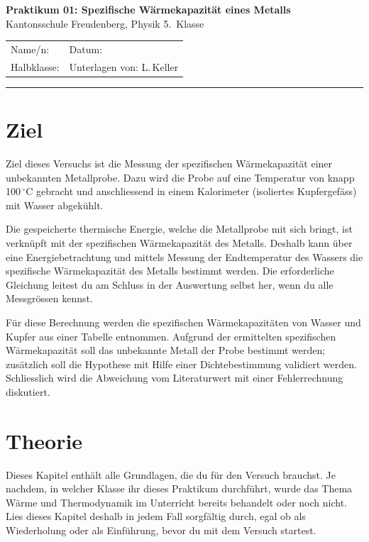 \documentclass[11pt,a4paper]{article}
\newcommand{\celsius}{\ensuremath{^{\circ}\mathrm{C}}}
\newcommand{\SI}[2]{#1\,#2}
\begin{document}
\thispagestyle{empty}

\begin{center}
  {\color{kfrblue}\Large\bfseries Praktikum 01: Spezifische W\"armekapazit\"at eines Metalls}\\[2pt]
  {\normalsize Kantonsschule Freudenberg, Physik 5.\ Klasse}
\end{center}

\vspace{4pt}
\noindent
\begin{tabularx}{\linewidth}{@{}X X@{}}
  Name/n: \dotfill & Datum: \dotfill \\[4pt]
  Halbklasse: \dotfill & Unterlagen von: L.\,Keller \\
\end{tabularx}

\vspace{10pt}
\hrule
\vspace{10pt}

\section{Ziel}
Ziel dieses Versuchs ist die Messung der spezifischen W\"armekapazit\"at einer unbekannten Metallprobe. Dazu wird die Probe auf eine Temperatur von knapp \SI{100}{\celsius} gebracht und anschliessend in einem Kalorimeter (isoliertes Kupfergef\"ass) mit Wasser abgek\"uhlt.

Die gespeicherte thermische Energie, welche die Metallprobe mit sich bringt, ist verkn\"upft mit der spezifischen W\"armekapazit\"at des Metalls. Deshalb kann \"uber eine Energiebetrachtung und mittels Messung der Endtemperatur des Wassers die spezifische W\"armekapazit\"at des Metalls bestimmt werden. Die erforderliche Gleichung leitest du am Schluss in der Auswertung selbst her, wenn du alle Messgr\"ossen kennst.

F\"ur diese Berechnung werden die spezifischen W\"armekapazit\"aten von Wasser und Kupfer aus einer Tabelle entnommen. Aufgrund der ermittelten spezifischen W\"armekapazit\"at soll das unbekannte Metall der Probe bestimmt werden; zus\"atzlich soll die Hypothese mit Hilfe einer Dichtebestimmung validiert werden. Schliesslich wird die Abweichung vom Literaturwert mit einer Fehlerrechnung diskutiert.

\section{Theorie}
\label{sec:theorie}
Dieses Kapitel enth\"alt alle Grundlagen, die du f\"ur den Versuch brauchst. Je nachdem, in welcher Klasse ihr dieses Praktikum durchf\"uhrt, wurde das Thema W\"arme und Thermodynamik im Unterricht bereits behandelt oder noch nicht. Lies dieses Kapitel deshalb in jedem Fall sorgf\"altig durch, egal ob als Wiederholung oder als Einf\"uhrung, bevor du mit dem Versuch startest.
\end{document}
